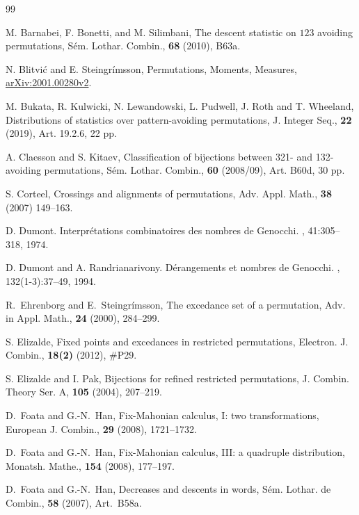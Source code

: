 \documentclass[12pt]{amsart} %
\numberwithin{equation}{section}
\theoremstyle{plain}
\theoremstyle{definition}
\begin{document}
\begin{thebibliography}{99} %

 M. Barnabei, F. Bonetti, and M. Silimbani, The descent statistic on $123$ avoiding permutations, S\'em. Lothar. Combin., {\bf68} (2010), B63a.

 N. Blitvi\'c and E. Steingr\'imsson, Permutations, Moments, Measures, \href{https://arxiv.org/abs/2001.00280}{arXiv:2001.00280v2}.

 M. Bukata, R.  Kulwicki, N. Lewandowski, L. Pudwell, J. Roth and T. Wheeland, Distributions of statistics over pattern-avoiding permutations, J. Integer Seq., {\bf22} (2019), Art. 19.2.6, 22 pp.

  A. Claesson and S. Kitaev,  Classification of bijections between 321- and 132-avoiding permutations, S\'em. Lothar. Combin., {\bf60} (2008/09), Art. B60d, 30 pp.

 S. Corteel, Crossings and alignments of permutations, Adv. Appl. Math., {\bf38} (2007) 149--163.

D. Dumont.
\newblock Interpr\'{e}tations combinatoires des nombres de {G}enocchi.
, 41:305--318, 1974.

D. Dumont and A. Randrianarivony.
\newblock D\'{e}rangements et nombres de {G}enocchi.
, 132(1-3):37--49, 1994.

 R.~Ehrenborg and E.~Steingr\'imsson, The excedance set of a permutation, Adv. in Appl. Math., {\bf24} (2000), 284--299.


 S. Elizalde, Fixed points and excedances in restricted permutations, Electron. J. Combin., {\bf18(2)} (2012), \#P29.

 S. Elizalde and I. Pak, Bijections for refined restricted permutations, 
J. Combin. Theory Ser. A, {\bf105} (2004), 207--219. 


 D.~Foata and G.-N.~Han, Fix-Mahonian calculus, I: two transformations, European J. Combin., {\bf 29} (2008), 1721--1732. 

 D.~Foata and G.-N.~Han, Fix-Mahonian calculus, III: a quadruple distribution, Monatsh. Mathe., {\bf 154} (2008), 177--197. 

 D.~Foata and G.-N.~Han, Decreases and descents in words, S\'em. Lothar. de Combin., {\bf 58} (2007), Art.~B58a.


\end{thebibliography}
\end{document}
